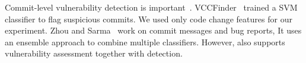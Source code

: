 

\vspace{3pt}
Commit-level vulnerability detection is
important~\cite{perl2015vccfinder,zhou2017automated,chen2019large}.
VCCFinder~\cite{perl2015vccfinder} trained a SVM classifier to flag
suspicious commits. We used only code change features for our
experiment. Zhou and Sarma~\cite{zhou2017automated} work on commit
messages and bug reports, It uses an ensemble approach to combine
multiple classifiers.
However, {\tool} also supports vulnerability assessment together with
detection.


